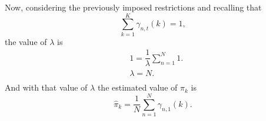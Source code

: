 \documentclass[12pt]{article}%
\begin{document}
Now, considering the previously imposed restrictions and recalling that
\begin{equation}
\sum _ { k = 1 } ^ { K } \gamma _ { n , t } ( k ) = 1,
\end{equation}
the value of $\lambda$ is
\begin{equation}
\begin{split}
& 1 = \dfrac{1}{\lambda} \sum \limits_{n=1}^{N}1.\\
& \lambda = N.\\
\end{split}
\end{equation}
And with that value of $\lambda$ the estimated value of $\pi_{k}$ is
\begin{equation}
\widehat{\pi}_{k} = \dfrac{1}{N} \sum \limits_{n=1}^{N} \gamma_{n,1}(k).
\end{equation}
\end{document}
